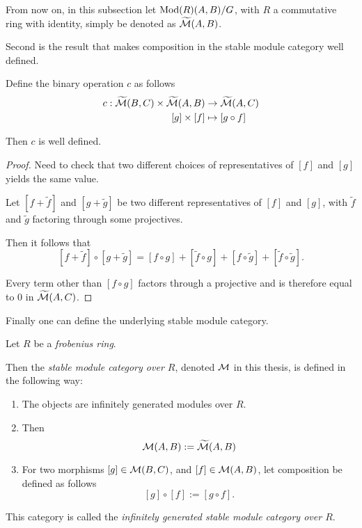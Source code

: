 From now on, in this subsection let \( \operatorname{Mod}(R)(A, B)/G \), with \( R \) a commutative ring with identity, simply be denoted as \( \widetilde{{\mathcal{M}}}(A, B) \).

Second is the result that makes composition in the stable module category well defined.

\begin{lemma}
    \label{lem:stmod_composition_well-defined}
    Define the binary operation \( c \) as follows
    \begin{align*}
        c: \widetilde{{\mathcal{M}}}(B, C) \times \widetilde{{\mathcal{M}}}(A, B) &\to \widetilde{{\mathcal{M}}}(A, C) \\
        [g] \times [f] &\mapsto [g \circ f]
    \end{align*}

    Then \( c \) is well defined.
\end{lemma}
\begin{proof}
    Need to check that two different choices of representatives of \( [f] \) and \( [g] \) yields the same value.

    Let \( [f + \widetilde{f}] \) and \( [g + \widetilde{g}] \) be two different representatives of \( [f] \) and \( [g] \), with \( \widetilde{f} \) and \( \widetilde{g} \) factoring through some projectives.

    Then it follows that
    \[
        [f + \widetilde{f}] \circ [g + \widetilde{g}] = [f \circ g] + [\widetilde{f} \circ g] + [f \circ \widetilde{g}] + [\widetilde{f} \circ \widetilde{g}].
    \]
    
    Every term other than \( [f \circ g] \) factors through a projective and is therefore equal to \( 0 \) in \( \widetilde{{\mathcal{M}}}(A, C) \).
\end{proof}

Finally one can define the underlying stable module category.

\begin{definition}
    \label{def:stable_module_category}
    Let \( R \) be a \emph{frobenius ring}.

    Then the \emph{stable module category over \( R \)}, denoted \( {\mathcal{M}} \) in this thesis, is defined in the following way:
    \begin{enumerate}
        \item {
            The objects are infinitely generated modules over \( R \).
        }
        \item {
            Then
            \[
                {\mathcal{M}}(A, B) := \widetilde{{\mathcal{M}}}(A, B)
            \]
        }
        \item {
            For two morphisms \( [g] \in {\mathcal{M}}(B, C) \), and \( [f] \in {\mathcal{M}}(A, B) \), let composition be defined as follows
            \[
                [g] \circ [f] := [g \circ f].
            \]
        }
    \end{enumerate}

    This category is called the \emph{infinitely generated stable module category over \( R \)}.
\end{definition}

